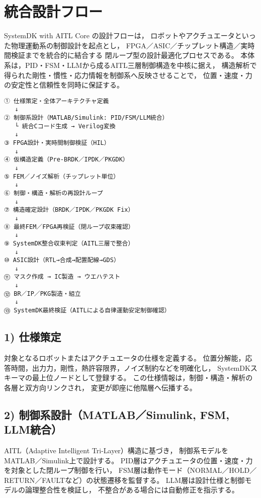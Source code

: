\section{統合設計フロー}

SystemDK with AITL Core の設計フローは，
ロボットやアクチュエータといった物理運動系の制御設計を起点とし，
FPGA／ASIC／チップレット構造／実時間検証までを統合的に結合する
閉ループ型の設計最適化プロセスである。
本体系は，PID・FSM・LLMから成るAITL三層制御構造を中核に据え，
構造解析で得られた剛性・慣性・応力情報を制御系へ反映させることで，
位置・速度・力の安定性と信頼性を同時に保証する。

\begin{verbatim}
① 仕様策定・全体アーキテクチャ定義
   ↓
② 制御系設計（MATLAB/Simulink: PID/FSM/LLM統合）
   └ 統合Cコード生成 → Verilog変換
   ↓
③ FPGA設計・実時間制御検証（HIL）
   ↓
④ 仮構造定義（Pre-BRDK／IPDK／PKGDK）
   ↓
⑤ FEM／ノイズ解析（チップレット単位）
   ↓
⑥ 制御・構造・解析の再設計ループ
   ↓
⑦ 構造確定設計（BRDK／IPDK／PKGDK Fix）
   ↓
⑧ 最終FEM／FPGA再検証（閉ループ収束確認）
   ↓
⑨ SystemDK整合収束判定（AITL三層で整合）
   ↓
⑩ ASIC設計（RTL→合成→配置配線→GDS）
   ↓
⑪ マスク作成 → IC製造 → ウエハテスト
   ↓
⑫ BR／IP／PKG製造・組立
   ↓
⑬ SystemDK最終検証（AITLによる自律運動安定制御確認）
\end{verbatim}

\subsection{1) 仕様策定}
対象となるロボットまたはアクチュエータの仕様を定義する。
位置分解能，応答時間，出力力，剛性，熱許容限界，ノイズ制約などを明確化し，
SystemDKスキーマの最上位ノードとして登録する。
この仕様情報は，制御・構造・解析の各層と双方向リンクされ，
変更が即座に他階層へ伝播する。

\subsection{2) 制御系設計（MATLAB／Simulink, FSM, LLM統合）}
AITL（Adaptive Intelligent Tri-Layer）構造に基づき，
制御系モデルをMATLAB／Simulink上で設計する。
PID層はアクチュエータの位置・速度・力を対象とした閉ループ制御を行い，
FSM層は動作モード（NORMAL／HOLD／RETURN／FAULTなど）の状態遷移を監督する。
LLM層は設計仕様と制御モデルの論理整合性を検証し，
不整合がある場合には自動修正を指示する。

